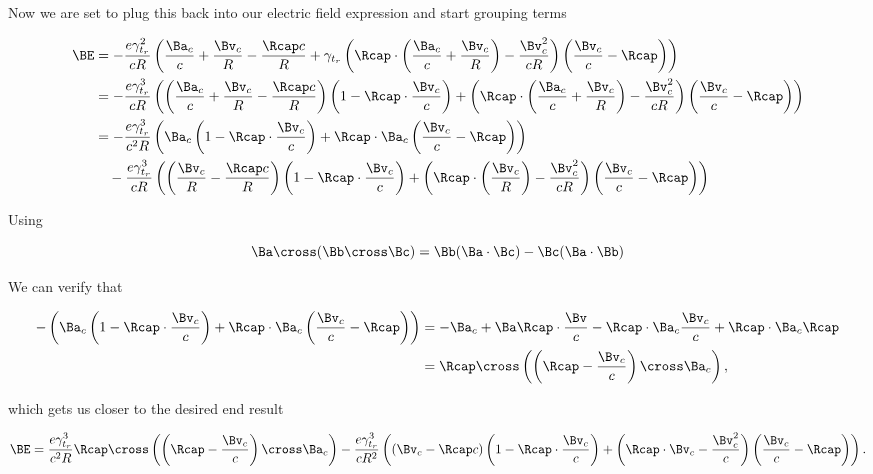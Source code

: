 Now we are set to plug this back into our electric field expression and start grouping terms

\begin{align*}
\BE
&= - \frac{e \gamma_{t_r}^2}{c R} \left( 
\frac{\Ba_c}{c} 
+\frac{\Bv_c}{R} 
- \frac{\Rcap c}{R}
+ \gamma_{t_r} \left( \Rcap \cdot \left( \frac{\Ba_c}{c} + \frac{\Bv_c}{R} \right) - \frac{\Bv_c^2}{c R} \right)
\left( \frac{\Bv_c}{c} - \Rcap \right)
\right) \\
&= - \frac{e \gamma_{t_r}^3}{c R} \left( 
\left(
\frac{\Ba_c}{c} 
+\frac{\Bv_c}{R} 
- \frac{\Rcap c}{R}
\right) \left(
1 -\Rcap \cdot \frac{\Bv_c}{c} 
\right)
+ \left( \Rcap \cdot \left( \frac{\Ba_c}{c} + \frac{\Bv_c}{R} \right) - \frac{\Bv_c^2}{c R} \right)
\left( \frac{\Bv_c}{c} - \Rcap \right)
\right) \\
&= 
- \frac{e \gamma_{t_r}^3}{c^2 R} \left( 
\Ba_c
\left(
1 -\Rcap \cdot \frac{\Bv_c}{c} 
\right)
+\Rcap \cdot \Ba_c \left( \frac{\Bv_c}{c} - \Rcap \right)
\right) \\
&\quad - \frac{e \gamma_{t_r}^3}{c R} \left( 
\left(
\frac{\Bv_c}{R} 
- \frac{\Rcap c}{R}
\right) 
\left(
1 -\Rcap \cdot \frac{\Bv_c}{c} 
\right)
+ \left( \Rcap \cdot \left( \frac{\Bv_c}{R} \right) - \frac{\Bv_c^2}{c R} \right)
\left( \frac{\Bv_c}{c} - \Rcap \right)
\right) \\
\end{align*}

Using

\begin{equation}\label{eqn:relElectroDynProblemSet5:510}
\Ba \cross (\Bb \cross \Bc) = \Bb (\Ba \cdot \Bc) - \Bc (\Ba \cdot \Bb)
\end{equation}

We can verify that

\begin{align*}
- \left( 
\Ba_c
\left(
1 -\Rcap \cdot \frac{\Bv_c}{c} 
\right)
+\Rcap \cdot \Ba_c \left( \frac{\Bv_c}{c} - \Rcap \right)
\right) 
&=
-\Ba_c + \Ba \Rcap \cdot \frac{\Bv}{c} - \Rcap \cdot \Ba_c \frac{\Bv_c}{c} + \Rcap \cdot \Ba_c \Rcap \\
&= \Rcap \cross \left( \left(\Rcap - \frac{\Bv_c}{c} \right) \cross \Ba_c \right),
\end{align*}

which gets us closer to the desired end result

\begin{equation}\label{eqn:relElectroDynProblemSet5:530}
\BE
= 
\frac{e \gamma_{t_r}^3}{c^2 R} \Rcap \cross \left( \left(\Rcap - \frac{\Bv_c}{c} \right) \cross \Ba_c \right)
- \frac{e \gamma_{t_r}^3}{c R^2} \left( 
\left(
\Bv_c
- \Rcap c
\right) 
\left(
1 -\Rcap \cdot \frac{\Bv_c}{c} 
\right)
+ \left( \Rcap \cdot \Bv_c - \frac{\Bv_c^2}{c} \right)
\left( \frac{\Bv_c}{c} - \Rcap \right)
\right).
\end{equation}

